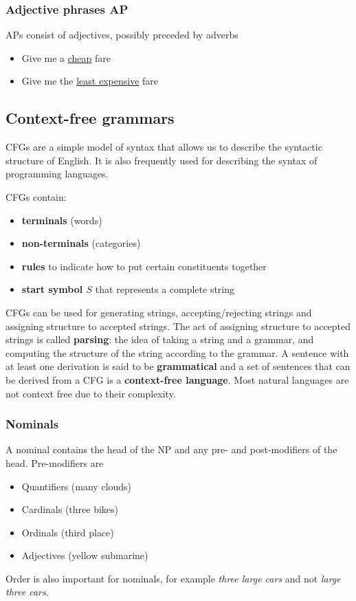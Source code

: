\documentclass[Report.tex]{subfiles}
\begin{document}
\subsubsection{Adjective phrases AP}
APs consist of adjectives, possibly preceded by adverbs
\begin{itemize}
\item Give me a \underline{cheap} fare
\item Give me the \underline{least expensive} fare
\end{itemize}


\subsection{Context-free grammars}
CFGs are a simple model of syntax that allows us to describe the syntactic
structure of English. It is also frequently used for describing the syntax of
programming languages.

CFGs contain:
\begin{itemize}
\item \textbf{terminals} (words)
\item \textbf{non-terminals} (categories)
\item \textbf{rules} to indicate how to put certain constituents together
\item \textbf{start symbol $S$} that represents a complete string
\end{itemize}

CFGs can be used for generating strings, accepting/rejecting strings and
assigning structure to accepted strings. The act of assigning structure to
accepted strings is called \textbf{parsing}: the idea of taking a string and
a grammar, and computing the structure of the string according to the grammar.
A sentence with at least one derivation is said to be \textbf{grammatical} and
a set of sentences that can be derived from a CFG is a \textbf{context-free
language}. Most natural languages are not context free due to their complexity.

\subsubsection{Nominals}
A nominal contains the head of the NP and any pre- and post-modifiers of the head.
Pre-modifiers are
\begin{itemize}
\item Quantifiers (many clouds)
\item Cardinals (three bikes)
\item Ordinals (third place)
\item Adjectives (yellow submarine)
\end{itemize}
Order is also important for nominals, for example \textit{three large cars} and
not \textit{large three cars}.
\end{document}
